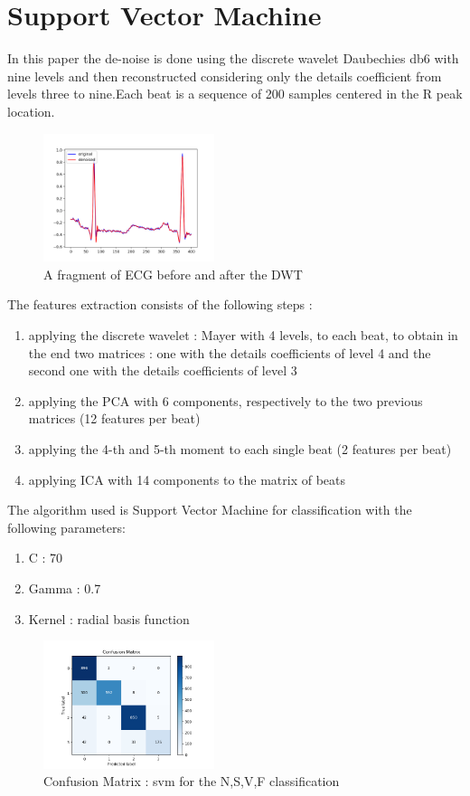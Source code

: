 \documentclass[LaM,binding=0.6cm]{sapthesis}
\begin{document}
\section{Support Vector Machine}
In this paper the de-noise is done using the discrete wavelet Daubechies db6 with nine levels and then reconstructed considering only the details coefficient from levels three to nine.Each beat is a sequence of 200 samples centered in the R peak location.
\begin{figure}[H]
	\includegraphics[width=50mm,scale=0.7]{svm-before-after}
	\caption{A fragment of ECG before and after the DWT}
	\label{fig:svc1}
\end{figure}
The features extraction consists of the following steps :
\begin{enumerate}
\item applying the discrete wavelet : Mayer with 4 levels, to each beat, to obtain in the end two matrices : one with the details coefficients of level 4 and the second one with the details coefficients of level 3 
\item applying the PCA with 6 components, respectively to the two previous matrices (12 features per beat)
\item applying the 4-th and 5-th moment to each single beat (2 features per beat)
\item applying ICA with 14 components to the matrix of beats
\end{enumerate}
The algorithm used is Support Vector Machine for classification with the following parameters:
\begin{enumerate}
\item C :  70
\item Gamma : 0.7
\item Kernel : radial basis function
\end{enumerate}
\begin{figure}[H]
	\includegraphics[width=50mm,scale=0.7]{confusion-matrix-linear-not-linear-no-aug-smaller-test.png}
	\caption{Confusion Matrix : svm for the N,S,V,F classification}
	\label{fig:svc2}
\end{figure}
\end{document}
